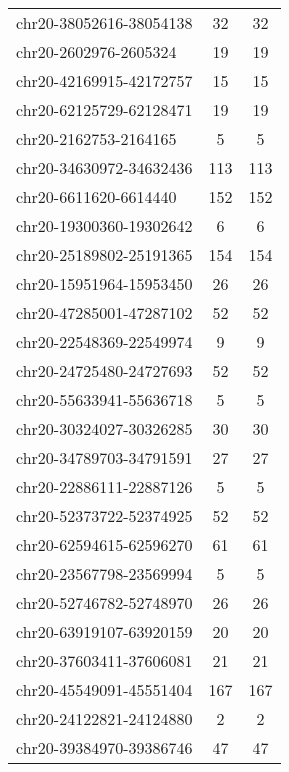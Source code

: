 \documentclass[10pt,letterpaper]{article}
\begin{document}
{\begin{longtable}{lSS}
	chr20-38052616-38054138 & 32     & 32                    \\
	chr20-2602976-2605324   & 19     & 19                    \\
	chr20-42169915-42172757 & 15     & 15                    \\
	chr20-62125729-62128471 & 19     & 19                    \\
	chr20-2162753-2164165   & 5      & 5                     \\
	chr20-34630972-34632436 & 113    & 113                   \\
	chr20-6611620-6614440   & 152    & 152                   \\
	chr20-19300360-19302642 & 6      & 6                     \\
	chr20-25189802-25191365 & 154    & 154                   \\
	chr20-15951964-15953450 & 26     & 26                    \\
	chr20-47285001-47287102 & 52     & 52                    \\
	chr20-22548369-22549974 & 9      & 9                     \\
	chr20-24725480-24727693 & 52     & 52                    \\
	chr20-55633941-55636718 & 5      & 5                     \\
	chr20-30324027-30326285 & 30     & 30                    \\
	chr20-34789703-34791591 & 27     & 27                    \\
	chr20-22886111-22887126 & 5      & 5                     \\
	chr20-52373722-52374925 & 52     & 52                    \\
	chr20-62594615-62596270 & 61     & 61                    \\
	chr20-23567798-23569994 & 5      & 5                     \\
	chr20-52746782-52748970 & 26     & 26                    \\
	chr20-63919107-63920159 & 20     & 20                    \\
	chr20-37603411-37606081 & 21     & 21                    \\
	chr20-45549091-45551404 & 167    & 167                   \\
	chr20-24122821-24124880 & 2      & 2                     \\
	chr20-39384970-39386746 & 47     & 47                    \\

\end{longtable}}
\end{document}
